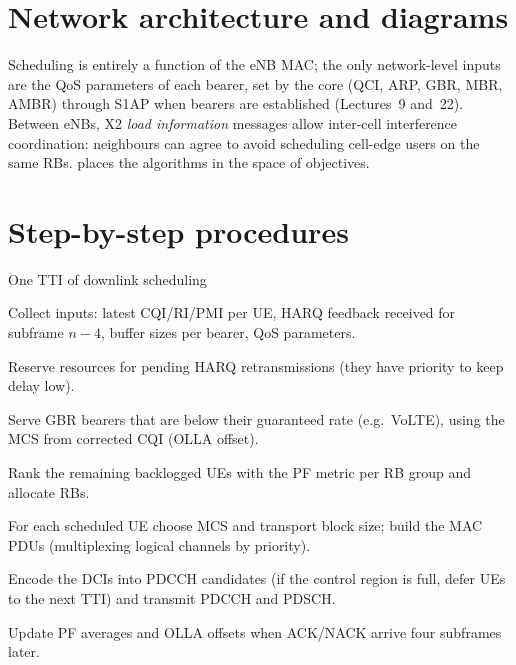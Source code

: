 \documentclass[11pt,a4paper]{article}
\begin{document}
\section{Network architecture and diagrams}
Scheduling is entirely a function of the eNB MAC; the only network-level inputs are the QoS
parameters of each bearer, set by the core (QCI, ARP, GBR, MBR, AMBR) through S1AP when bearers are
established (Lectures~9 and~22). Between eNBs, X2 \emph{load information} messages allow inter-cell
interference coordination: neighbours can agree to avoid scheduling cell-edge users on the same RBs.
 places the algorithms in the space of objectives.

\begin{acnfigure}
  \caption{The scheduling trilemma. No algorithm maximises throughput, fairness and QoS at once;
  practical schedulers combine a QoS stage with a PF-like stage.}
  \label{fig:trilemma}
\end{acnfigure}

\section{Step-by-step procedures}
\begin{procedurebox}{One TTI of downlink scheduling}\label{proc:dl}
\begin{steps}
  \item Collect inputs: latest CQI/RI/PMI per UE, HARQ feedback received for subframe $n-4$, buffer
        sizes per bearer, QoS parameters.
  \item Reserve resources for pending HARQ retransmissions (they have priority to keep delay low).
  \item Serve GBR bearers that are below their guaranteed rate (e.g.\ VoLTE), using the MCS from
        corrected CQI (OLLA offset).
  \item Rank the remaining backlogged UEs with the PF metric per RB group and allocate RBs.
  \item For each scheduled UE choose MCS and transport block size; build the MAC PDUs (multiplexing
        logical channels by priority).
  \item Encode the DCIs into PDCCH candidates (if the control region is full, defer UEs to the next TTI)
        and transmit PDCCH and PDSCH.
  \item Update PF averages and OLLA offsets when ACK/NACK arrive four subframes later.
\end{steps}
\end{procedurebox}
\end{document}
